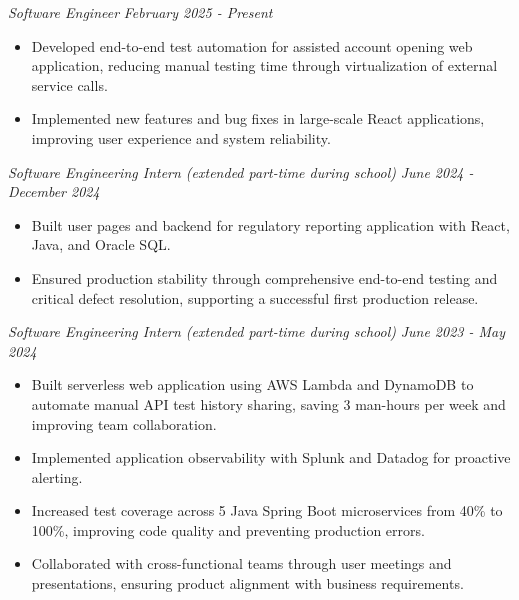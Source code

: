 \documentclass[letterpaper]{article}
\begin{document}
    \textit{Software Engineer} \hfill \textsl{February 2025 - Present}\\
    \vspace{-7pt}
    \begin{itemize} \itemsep -1mm

            \item Developed end-to-end test automation for assisted account opening web application, reducing manual testing time through virtualization of external service calls.

            \item Implemented new features and bug fixes in large-scale React applications, improving user experience and system reliability.

    \end{itemize}
    \vspace{-2mm}
    
    \textit{Software Engineering Intern (extended part-time during school)} \hfill \textsl{June 2024 - December 2024}\\
    \vspace{-7pt}
    \begin{itemize} \itemsep -1mm

            \item Built user pages and backend for regulatory reporting application with React, Java, and Oracle SQL.
            
            \item Ensured production stability through comprehensive end-to-end testing and critical defect resolution, supporting a successful first production release.

    \end{itemize}
    \vspace{-2mm}


    \textit{Software Engineering Intern (extended part-time during school)} \hfill \textsl{June 2023 - May 2024}\\
    \vspace{-7pt}
    \begin{itemize} \itemsep -1mm
        
            \item Built serverless web application using AWS Lambda and DynamoDB to automate manual API test history sharing, saving 3 man-hours per week and improving team collaboration.            
            
            \item Implemented application observability with Splunk and Datadog for proactive alerting.

            \item Increased test coverage across 5 Java Spring Boot microservices from 40\% to 100\%, improving code quality and preventing production errors.

            \item Collaborated with cross-functional teams through user meetings and presentations, ensuring product alignment with business requirements.
                
    \end{itemize}
    \vspace{-2mm}
\end{document}
